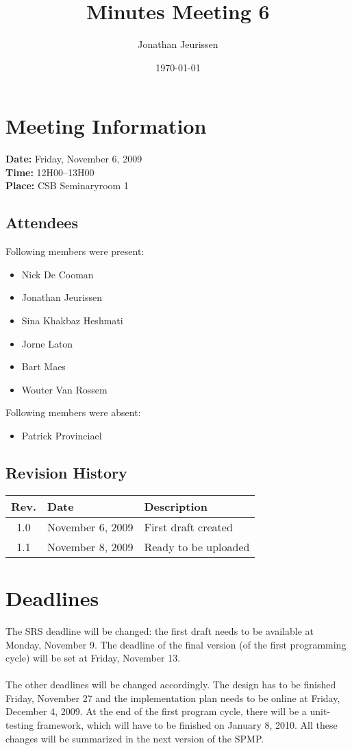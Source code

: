 \documentclass[a4paper, 12pt]{article}
\begin{document}
\title{Minutes Meeting 6}
\author{Jonathan Jeurissen}
\date{\today}

\maketitle	
	\section{Meeting Information}
		\textbf{Date:} Friday, November 6, 2009\\
		\textbf{Time:} 12H00--13H00\\
		\textbf{Place:} CSB Seminaryroom 1\\
		\subsection{Attendees}
Following members were present:
			\begin{itemize}
				\item Nick De Cooman
				\item Jonathan Jeurissen
				\item Sina Khakbaz Heshmati
				\item Jorne Laton
				\item Bart Maes
				\item Wouter Van Rossem
			\end{itemize}
Following members were absent:
			\begin{itemize}
				\item Patrick Provinciael
			\end{itemize}
			
		\subsection{Revision History}
			\begin{tabular}{c | l | l }
				\textbf{Rev.} & \textbf{Date} & \textbf{Description} \\
				\hline
				1.0 & November 6, 2009 & First draft created \\
				1.1 & November 8, 2009 & Ready to be uploaded \\
			\end{tabular}		

	\section{Deadlines}
The SRS deadline will be changed: the first draft needs to be available at Monday, November 9. The deadline of the final version (of the first programming cycle) will be set at Friday, November 13.\\ \\ 
The other deadlines will be changed accordingly.
The design has to be finished Friday, November 27 and the implementation plan needs to be online at Friday, December 4, 2009. At the end of the first program cycle, there will be a unit-testing framework, which will have to be finished on January 8, 2010. All these changes will be summarized in the next version of the SPMP.\\
\end{document}
